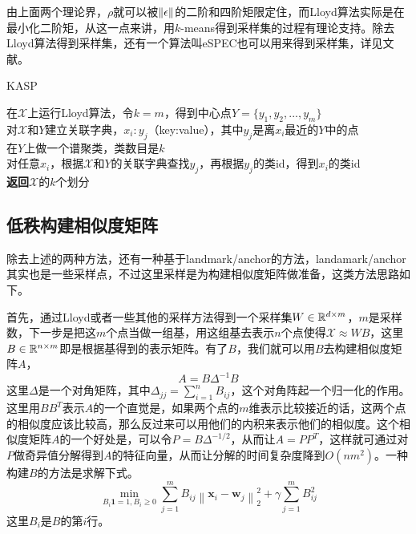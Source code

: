 由上面两个理论界，$\rho$就可以被$\left\lVert\epsilon\right\rVert$的二阶和四阶矩限定住，而Lloyd算法实际是在最小化二阶矩，从这一点来讲，用$k$-means得到采样集的过程有理论支持。除去Lloyd算法得到采样集，还有一个算法叫eSPEC也可以用来得到采样集，详见文献\cite{wang2009approximate}。
\begin{algorithm}
    \caption{KASP}\label{alg: KASP}
    在$\mathcal{X}$上运行Lloyd算法，令$k=m$，得到中心点$Y = \{y_1,y_2,...,y_m\}$\\
    对$\mathcal{X}$和$Y$建立关联字典，$x_i:y_j$（key:value），其中$y_j$是离$x_i$最近的$Y$中的点　\\
    在$Y$上做一个谱聚类，类数目是$k$ \\
    对任意$x_i$，根据$\mathcal{X}$和$Y$的关联字典查找$y_j$，再根据$y_j$的类id，得到$x_i$的类id\\
    \textbf{返回}$\mathcal{X}$的$k$个划分
\end{algorithm}

\subsection{低秩构建相似度矩阵}
除去上述的两种方法，还有一种基于landmark/anchor的方法，landamark/anchor其实也是一些采样点，不过这里采样是为构建相似度矩阵做准备，这类方法思路如下。

首先，通过Lloyd或者一些其他的采样方法得到一个采样集$W \in \mathbb{R}^{d \times m}$，$m$是采样数，下一步是把这$m$个点当做一组基，用这组基去表示$n$个点使得$\mathcal{X} \approx WB$，这里$B \in \mathbb{R}^{n \times m}$即是根据基得到的表示矩阵。有了$B$，我们就可以用$B$去构建相似度矩阵$A$，
\begin{equation}
    A = B\Delta^{-1}B
\end{equation}
这里$\Delta$是一个对角矩阵，其中$\Delta_{jj} = \sum_{i=1}^n B_{ij}$，这个对角阵起一个归一化的作用。这里用$BB^T$表示$A$的一个直觉是，如果两个点的$m$维表示比较接近的话，这两个点的相似度应该比较高，那么反过来可以用他们的内积来表示他们的相似度。这个相似度矩阵$A$的一个好处是，可以令$P = B\Delta^{-1/2}$，从而让$A = PP^T$，这样就可通过对$P$做奇异值分解得到$A$的特征向量，从而让分解的时间复杂度降到$O(nm^2)$。一种构建$B$的方法是求解下式。
\begin{equation}
    \min _{B_i \mathbf{1}=1, B_i \geq 0} \sum_{j=1}^{m} B_{i j}\left\|\mathbf{x}_{i}-\mathbf{w}_{j}\right\|_{2}^{2}+\gamma \sum_{j=1}^{m} B_{i j}^{2}
\end{equation}
这里$B_i$是$B$的第$i$行。

